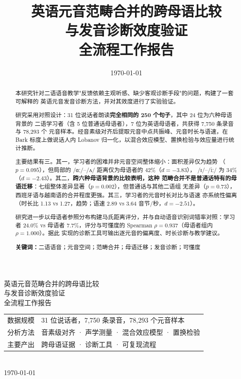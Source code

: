 \documentclass[11pt,a4paper]{ctexart}
\title{\heiti\LARGE 英语元音范畴合并的跨母语比较\\[4pt]
       \heiti\LARGE 与发音诊断效度验证\\[10pt]
       \normalsize\normalfont 全流程工作报告}
\author{}
\date{\today}
\newcommand{\ipa}[1]{/#1/}
\begin{document}
\begin{titlepage}
\centering
\vspace*{3.5cm}
{\heiti\LARGE 英语元音范畴合并的跨母语比较}\\[8pt]
{\heiti\LARGE 与发音诊断效度验证}\\[28pt]
{\Large 全流程工作报告}\\[60pt]
{\large
\begin{tabular}{rl}
数据规模 & 31 位说话者，7{,}750 条录音，78{,}293 个元音样本\\[3pt]
分析方法 & 音素级对齐 · 声学测量 · 混合效应模型 · 置换检验\\[3pt]
主要产出 & 跨母语证据 · 诊断工具 · 可复现流程\\
\end{tabular}}\\[80pt]
{\large \today}
\vfill
\end{titlepage}

\begin{abstract}
\noindent
本研究针对二语语音教学"反馈依赖主观听感、缺少客观诊断手段"的问题，构建了一套可解释的
英语元音发音诊断方法，并对其效度进行了实验验证。

研究采用对照设计：31 位说话者朗读\textbf{完全相同的 250 个句子}，其中 24 位为六种母语背景的
二语学习者（含 5 位普通话母语者），7 位为英语母语者，共获得 7{,}750 条录音与 78{,}293 个
元音样本。经音素级对齐后提取元音中点共振峰、元音时长与语速，在 Bark 标度上做说话人内
Lobanov 归一化，以混合效应模型、置换检验与效应量进行统计推断。

主要结果有三。其一，学习者的困难并非元音空间整体缩小：面积差异仅为趋势
（$p=0.095$），但局部的 \ipa{ɑː}–\ipa{ʌ} 距离仅为母语者的 42\%（$d=-3.83$），
\ipa{ɪ}–\ipa{iː} 为 34\%（$d=-2.43$）。其二，\textbf{跨六种母语背景的比较表明，这种
范畴合并不是普通话特有的母语迁移}：七组整体差异显著（$p=0.002$），但普通话与其他二语组
无差异（$p=0.73$），西班牙语与越南语的合并程度更强。其三，学习者的元音时长对比与语速
亦系统性偏离（时长比 1.13 vs 1.27，趋势；语速 2.89 vs 3.64 音节/秒，$d=-2.51$）。

研究进一步以母语者参照分布构建马氏距离评分，并与自动语音识别词错率对照：学习者 24.0\%
vs 母语者 7.7\%，评分与可懂度的 Spearman $\rho=0.937$（母语者组内 $\rho=1.000$）。据此
实现的诊断工具可输出逐元音的偏离度、时长诊断与教学建议。

\vspace{6pt}
\noindent\textbf{关键词：}二语语音；元音空间；范畴合并；母语迁移；发音诊断；可懂度
\end{abstract}
\end{document}
